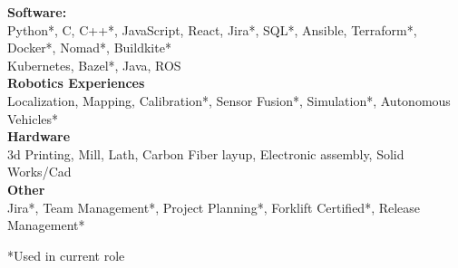 \documentclass[12pt]{article}
\newcommand{\Heading}[1]{\\{\large \textbf{#1}\\[-.5em]  \rule{20cm}{.1cm} \- \vspace{-.25cm}}}
\begin{document}
\textbf{Software:} \\
\hspace*{1cm} Python*, C, C++*, JavaScript, React, Jira*, SQL*, Ansible, Terraform*, Docker*, Nomad*, Buildkite*\\
\hspace*{1cm} Kubernetes, Bazel*, Java, ROS \\
\textbf{Robotics Experiences} \\
\hspace*{1cm} Localization, Mapping, Calibration*, Sensor Fusion*, Simulation*, Autonomous Vehicles*\\
\textbf{Hardware}\\
\hspace*{1cm} 3d Printing, Mill, Lath, Carbon Fiber layup, Electronic assembly, Solid Works/Cad \\
\textbf{Other}\\
\hspace*{1cm} Jira*, Team Management*, Project Planning*, Forklift Certified*, Release Management*\\
{\begin{flushright} *Used in current role \end{flushright}}
%
%
%
%
%
\end{document}
